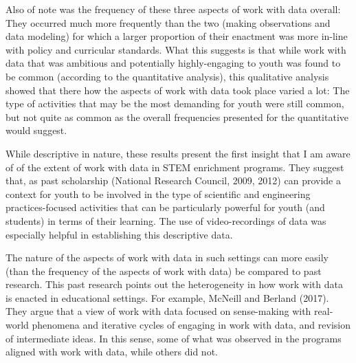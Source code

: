 \documentclass[]{msu-thesis}
\theoremstyle{definition}
\theoremstyle{definition}
\theoremstyle{definition}
\theoremstyle{remark}
\begin{document}
Also of note was the frequency of these three aspects of work with data
overall: They occurred much more frequently than the two (making
observations and data modeling) for which a larger proportion of their
enactment was more in-line with policy and curricular standards. What
this suggests is that while work with data that was ambitious and
potentially highly-engaging to youth was found to be common (according
to the quantitative analysis), this qualitative analysis showed that
there how the aspects of work with data took place varied a lot: The
type of activities that may be the most demanding for youth were still
common, but not quite as common as the overall frequencies presented for
the quantitative would suggest.

While descriptive in nature, these results present the first insight
that I am aware of of the extent of work with data in STEM enrichment
programs. They suggest that, as past scholarship (National Research
Council, 2009, 2012) can provide a context for youth to be involved in
the type of scientific and engineering practices-focused activities that
can be particularly powerful for youth (and students) in terms of their
learning. The use of video-recordings of data was especially helpful in
establishing this descriptive data.

The nature of the aspects of work with data in such settings can more
easily (than the frequency of the aspects of work with data) be compared
to past research. This past research points out the heterogeneity in how
work with data is enacted in educational settings. For example, McNeill
and Berland (2017). They argue that a view of work with data focused on
sense-making with real-world phenomena and iterative cycles of engaging
in work with data, and revision of intermediate ideas. In this sense,
some of what was observed in the programs aligned with work with data,
while others did not.
\end{document}
